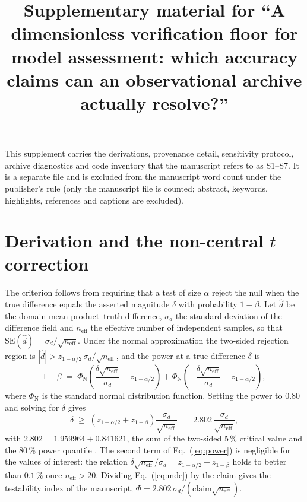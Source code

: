 \documentclass[preprint,12pt,authoryear]{elsarticle}
\begin{document}
\begin{frontmatter}

\title{Supplementary material for ``A dimensionless verification floor for model assessment: which accuracy claims can an observational archive actually resolve?''}

\end{frontmatter}

\noindent This supplement carries the derivations, provenance detail, sensitivity protocol, archive diagnostics and code inventory that the manuscript refers to as S1--S7. It is a separate file and is excluded from the manuscript word count under the publisher's rule (only the manuscript file is counted; abstract, keywords, highlights, references and captions are excluded).

\section{Derivation and the non-central $t$ correction}
\label{sec:s1}

The criterion follows from requiring that a test of size $\alpha$ reject the null when the true difference equals the asserted magnitude $\delta$ with probability $1-\beta$. Let $\hat{d}$ be the domain-mean product--truth difference, $\sigma_d$ the standard deviation of the difference field and $n_{\mathrm{eff}}$ the effective number of independent samples, so that $\mathrm{SE}(\hat{d}) = \sigma_d/\sqrt{n_{\mathrm{eff}}}$. Under the normal approximation the two-sided rejection region is $|\hat{d}| > z_{1-\alpha/2}\,\sigma_d/\sqrt{n_{\mathrm{eff}}}$, and the power at a true difference $\delta$ is
\begin{equation}
1-\beta \;=\; \Phi_{\mathrm{N}}\!\left(\frac{\delta\sqrt{n_{\mathrm{eff}}}}{\sigma_d}-z_{1-\alpha/2}\right)
+ \Phi_{\mathrm{N}}\!\left(-\frac{\delta\sqrt{n_{\mathrm{eff}}}}{\sigma_d}-z_{1-\alpha/2}\right),
\label{eq:power}
\end{equation}
where $\Phi_{\mathrm{N}}$ is the standard normal distribution function. Setting the power to $0.80$ and solving for $\delta$ gives
\begin{equation}
\delta \;\ge\; \left(z_{1-\alpha/2}+z_{1-\beta}\right)\frac{\sigma_d}{\sqrt{n_{\mathrm{eff}}}}
\;=\; 2.802\,\frac{\sigma_d}{\sqrt{n_{\mathrm{eff}}}},
\label{eq:mde}
\end{equation}
with $2.802 = 1.959964 + 0.841621$, the sum of the two-sided 5\,\% critical value and the 80\,\% power quantile \citep{cohen1992power,lenth2001some}. The second term of Eq.~(\ref{eq:power}) is negligible for the values of interest: the relation $\delta\sqrt{n_{\mathrm{eff}}}/\sigma_d = z_{1-\alpha/2}+z_{1-\beta}$ holds to better than $0.1\,\%$ once $n_{\mathrm{eff}} > 20$. Dividing Eq.~(\ref{eq:mde}) by the claim gives the testability index of the manuscript, $\Phi = 2.802\,\sigma_d/(\mathrm{claim}\sqrt{n_{\mathrm{eff}}})$.
\end{document}
